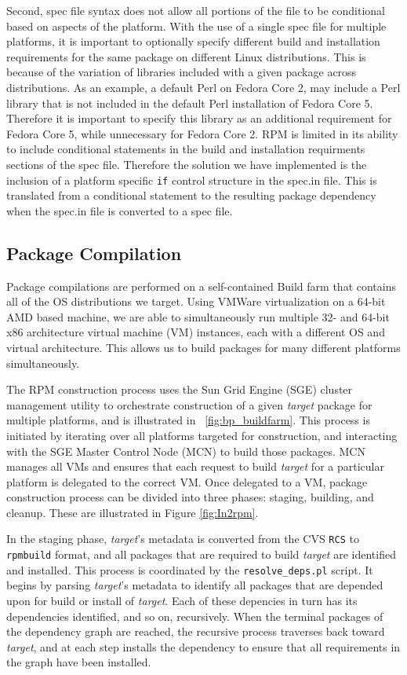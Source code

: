 Second, spec file syntax does not allow all portions of the file to be
conditional based on aspects of the platform. With the use of a single spec
file for multiple platforms, it is important to optionally specify different
build and installation requirements for the same package on different Linux
distributions. This is because of the variation of libraries included with a
given package across distributions. As an example, a default Perl on Fedora
Core 2, may include a Perl library that is not included in the default Perl
installation of Fedora Core 5. Therefore it is important to specify this
library as an additional requirement for Fedora Core 5, while unnecessary for
Fedora Core 2. RPM is limited in its ability to include conditional statements
in the build and installation requirments sections of the spec file. Therefore
the solution we have implemented is the inclusion of a platform specific
\texttt{if} control structure in the spec.in file.  This is translated from a
conditional statement to the resulting package dependency when the spec.in file
is converted to a spec file.

\subsection{Package Compilation}

Package compilations are performed on a self-contained Build farm that
contains all of the OS distributions we target. Using VMWare virtualization on a
64-bit AMD based machine, we are able to simultaneously run multiple
32- and 64-bit x86 architecture virtual machine (VM) instances, each with a
different OS and virtual architecture.  This allows us to build packages for
many different platforms simultaneously.

The RPM construction process uses the Sun Grid Engine (SGE) cluster management utility to
orchestrate construction of a given \textit{target} package for multiple platforms, and is illustrated in ~\ref{fig:bp_buildfarm}.
This process is initiated by iterating over all platforms targeted for construction, and interacting with the
SGE Master Control Node (MCN) to build those packages.  MCN manages all VMs and ensures
that each request to build \textit{target} for a particular platform is delegated to the correct VM.  Once
delegated to a VM, package construction process can be divided into three phases:
staging, building, and cleanup.  These are illustrated in Figure \ref{fig:In2rpm}.

In the staging phase, \textit{target}'s metadata is converted from the CVS \texttt{RCS} to \texttt{rpmbuild}
format, and all packages that are required to build \textit{target} are identified and installed.  This
process is coordinated by the \texttt{resolve\_deps.pl} script.  It begins by parsing \textit{target}'s
metadata to identify all packages that are depended upon for build or install of \textit{target}.  Each of
these depencies in turn has its dependencies identified, and so on, recursively.  When the terminal
packages of the dependency graph are reached, the recursive process traverses back toward
\textit{target}, and at each step installs the dependency to ensure that all requirements in the graph
have been installed.

